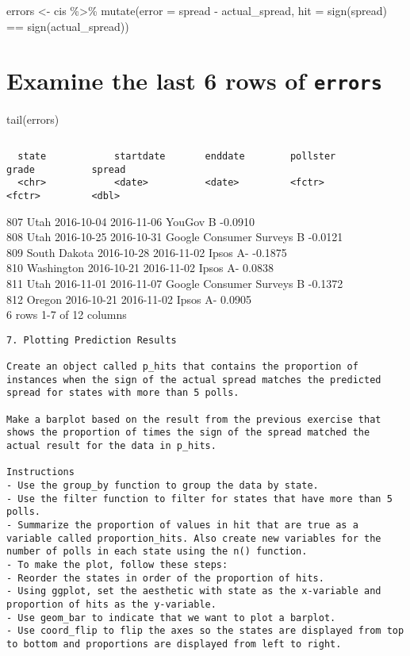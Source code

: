 \documentclass[
]{article}
\begin{document}
errors \textless- cis \%\textgreater\% mutate(error = spread -
actual\_spread, hit = sign(spread) == sign(actual\_spread))

\hypertarget{examine-the-last-6-rows-of-errors}{%
\section{\texorpdfstring{Examine the last 6 rows of
\texttt{errors}}{Examine the last 6 rows of errors}}\label{examine-the-last-6-rows-of-errors}}

tail(errors)

\begin{verbatim}
\end{verbatim}

\begin{verbatim}
  state            startdate       enddate        pollster                 grade          spread
  <chr>            <date>          <date>         <fctr>                   <fctr>         <dbl>
\end{verbatim}

807 Utah 2016-10-04 2016-11-06 YouGov B -0.0910\\
808 Utah 2016-10-25 2016-10-31 Google Consumer Surveys B -0.0121\\
809 South Dakota 2016-10-28 2016-11-02 Ipsos A- -0.1875\\
810 Washington 2016-10-21 2016-11-02 Ipsos A- 0.0838\\
811 Utah 2016-11-01 2016-11-07 Google Consumer Surveys B -0.1372\\
812 Oregon 2016-10-21 2016-11-02 Ipsos A- 0.0905\\
6 rows \textbar{} 1-7 of 12 columns

\begin{verbatim}
7. Plotting Prediction Results

Create an object called p_hits that contains the proportion of instances when the sign of the actual spread matches the predicted spread for states with more than 5 polls.

Make a barplot based on the result from the previous exercise that shows the proportion of times the sign of the spread matched the actual result for the data in p_hits.

Instructions
- Use the group_by function to group the data by state.
- Use the filter function to filter for states that have more than 5 polls.
- Summarize the proportion of values in hit that are true as a variable called proportion_hits. Also create new variables for the number of polls in each state using the n() function.
- To make the plot, follow these steps:
- Reorder the states in order of the proportion of hits.
- Using ggplot, set the aesthetic with state as the x-variable and proportion of hits as the y-variable.
- Use geom_bar to indicate that we want to plot a barplot.
- Use coord_flip to flip the axes so the states are displayed from top to bottom and proportions are displayed from left to right.
\end{verbatim}
\end{document}
